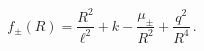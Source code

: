 \begin{equation}f_{\pm}(R)=\frac{R^2}{\ell^2}+k-\frac{\mu_{\pm}}{R^2}+
\frac{q^2}{R^4}\,.\end{equation}

